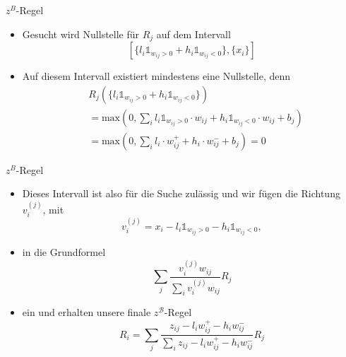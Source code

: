 \begin{frame}{$z^B$-Regel}
\begin{itemize}
\item Gesucht wird Nullstelle für $R_j $ auf dem Intervall \\
\begin{equation*}
\left[\{l_i \mathds{1}_{w_{ij} > 0} + h_i \mathds{1}_{w_{ij} < 0}\}, \{x_i\}\right]
\end{equation*}
\item Auf diesem Intervall existiert mindestens eine Nullstelle, denn
\begin{align*}
&R_j\left(\{l_i \mathds{1}_{w_{ij} > 0} + h_i \mathds{1}_{w_{ij} < 0}\}\right) \\
&= \text{max} \left(0, \sum_i l_i \mathds{1}_{w_{ij} > 0} \cdot w_{ij} + h_i \mathds{1}_{w_{ij} < 0} \cdot w_{ij} + b_j \right) \\
&= \text{max} \left(0, \sum_i l_i \cdot w_{ij}^+ + h_i \cdot w_{ij}^- + b_j \right) = 0
\end{align*}
\end{itemize}
\end{frame}

\begin{frame}{$z^B$-Regel}
\begin{itemize}
\item Dieses Intervall ist also für die Suche zulässig und wir fügen die Richtung $v_i^{(j)}$, mit
\begin{equation*}
v_{i}^{(j)} = x_i - l_i \mathds{1}_{w_{ij} > 0} - h_i \mathds{1}_{w_{ij} < 0},
\end{equation*}
\item in die Grundformel
\begin{equation*}
\sum_{j} \frac{v_{i}^{(j)} w_{i j}}{\sum_{i} v_{i}^{(j)} w_{i j}} R_{j}
\end{equation*}
\item ein und erhalten unsere finale $z^{\mathcal{B}}$-Regel
\begin{equation*}
R_{i}=\sum_{j} \frac{z_{i j}-l_{i} w_{i j}^{+}-h_{i} w_{i j}^{-}}{\sum_{i} z_{i j}-l_{i} w_{i j}^{+}-h_{i} w_{i j}^{-}} R_{j}
\end{equation*}
\end{itemize}
\end{frame}
